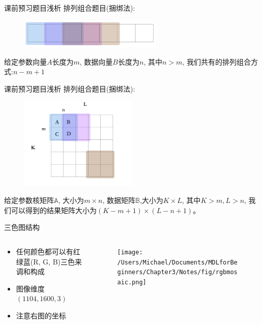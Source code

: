 \documentclass[handout]{beamer}
\begin{document}
\begin{frame}{课前预习题目浅析}
排列组合题目(捆绑法): 
\begin{figure}[H]
		\centering
	\includegraphics[width=0.61\textwidth]{fig/permutation}
	\end{figure}	
	给定参数向量$A$长度为$m$, 数据向量$B$长度为$n$, 其中$n> m$, 我们共有的排列组合方式:$n-m+1$
\end{frame}

\begin{frame}{课前预习题目浅析}
排列组合题目(捆绑法): 
\begin{figure}[H]
	\centering
	\includegraphics[width=0.5\textwidth]{fig/permatrix}
\end{figure}
给定参数核矩阵$\mathbb{A}$, 大小为$m \times n$, 数据矩阵$\mathbb{B}$,大小为$K \times L$, 其中$K >m, L> n$, 我们可以得到的结果矩阵大小为$(K-m+1) \times (L-n+1)$。
\end{frame}

\begin{frame}{三色图结构}
\begin{columns}
	\begin{column}{0.25\textwidth}
		\begin{itemize}
			\item \footnotesize{任何颜色都可以有红绿蓝(R, G, B)三色来调和构成}
			\item \footnotesize{图像维度 $(1104, 1600, 3)$}
			\item 注意右图的坐标
		\end{itemize}
	\end{column}
	\begin{column}{0.65\textwidth}
		\begin{figure}[H]
	\texttt{[image: /Users/Michael/Documents/MDLforBeginners/Chapter3/Notes/fig/rgbmosaic.png]}
\end{figure}	
	\end{column}
\end{columns}
\end{frame}
\end{document}
